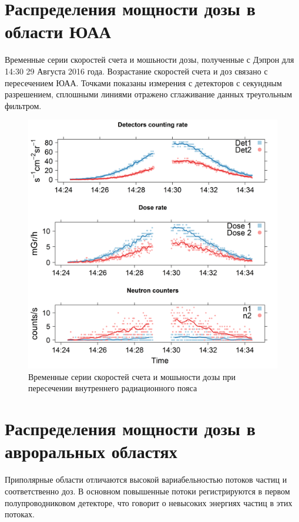 \section{Распределения мощности дозы в области ЮАА}
Временные серии скоростей счета и мошьности дозы, полученные с Дэпрон для 14:30 29 Августа 2016 года. Возрастание скоростей счета и доз связано с пересечением ЮАА. Точками показаны измерения с детекторов с секундным разрешением, сплошными линиями отражено сглаживание данных треугольным фильтром.
\begin{figure}
	\centering
	\includegraphics[width=0.7\linewidth]{images/results/depron_sec_log_new08-29-1614-24-23}
	\caption{Временные серии скоростей счета и мошьности дозы при пересечении внутреннего радиационного пояса}	\label{fig:depronseclognew08-29-1614-24-23}
\end{figure}


\section{Распределения мощности дозы в авроральных областях}
Приполярные области отличаются высокой вариабельностью потоков частиц и соответственно доз. В основном повышенные потоки регистрируются в первом полупроводниковом детекторе, что говорит о невысоких энергиях частиц в этих потоках.

